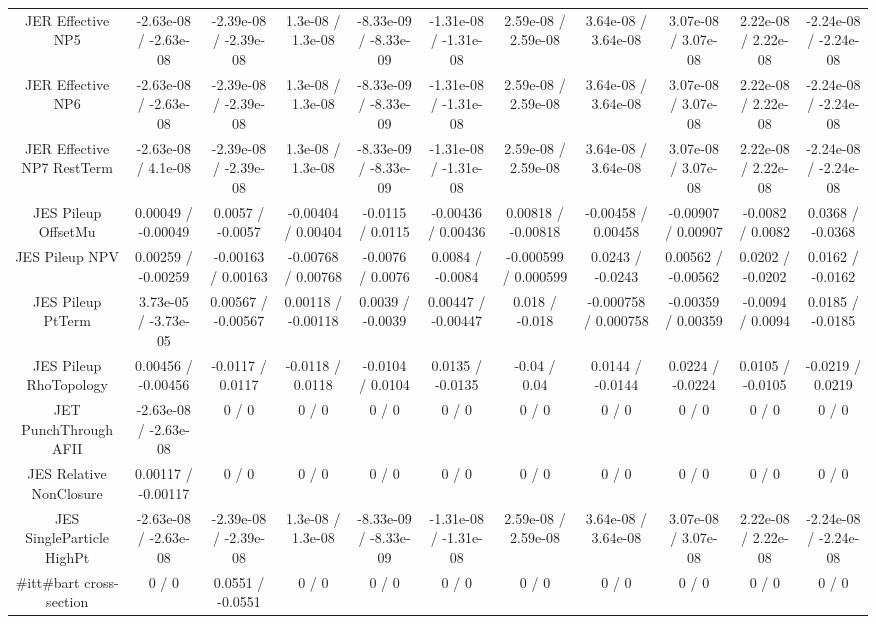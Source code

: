 \begin{table}[htbp]
\begin{center}
\begin{tabular}{|c|c|c|c|c|c|c|c|c|c|c|}
  JER Effective NP5 & -2.63e-08 / -2.63e-08 & -2.39e-08 / -2.39e-08 & 1.3e-08 / 1.3e-08 & -8.33e-09 / -8.33e-09 & -1.31e-08 / -1.31e-08 & 2.59e-08 / 2.59e-08 & 3.64e-08 / 3.64e-08 & 3.07e-08 / 3.07e-08 & 2.22e-08 / 2.22e-08 & -2.24e-08 / -2.24e-08 \\ 
  JER Effective NP6 & -2.63e-08 / -2.63e-08 & -2.39e-08 / -2.39e-08 & 1.3e-08 / 1.3e-08 & -8.33e-09 / -8.33e-09 & -1.31e-08 / -1.31e-08 & 2.59e-08 / 2.59e-08 & 3.64e-08 / 3.64e-08 & 3.07e-08 / 3.07e-08 & 2.22e-08 / 2.22e-08 & -2.24e-08 / -2.24e-08 \\ 
  JER Effective NP7 RestTerm & -2.63e-08 / 4.1e-08 & -2.39e-08 / -2.39e-08 & 1.3e-08 / 1.3e-08 & -8.33e-09 / -8.33e-09 & -1.31e-08 / -1.31e-08 & 2.59e-08 / 2.59e-08 & 3.64e-08 / 3.64e-08 & 3.07e-08 / 3.07e-08 & 2.22e-08 / 2.22e-08 & -2.24e-08 / -2.24e-08 \\ 
  JES Pileup OffsetMu & 0.00049 / -0.00049 & 0.0057 / -0.0057 & -0.00404 / 0.00404 & -0.0115 / 0.0115 & -0.00436 / 0.00436 & 0.00818 / -0.00818 & -0.00458 / 0.00458 & -0.00907 / 0.00907 & -0.0082 / 0.0082 & 0.0368 / -0.0368 \\ 
  JES Pileup NPV & 0.00259 / -0.00259 & -0.00163 / 0.00163 & -0.00768 / 0.00768 & -0.0076 / 0.0076 & 0.0084 / -0.0084 & -0.000599 / 0.000599 & 0.0243 / -0.0243 & 0.00562 / -0.00562 & 0.0202 / -0.0202 & 0.0162 / -0.0162 \\ 
  JES Pileup PtTerm & 3.73e-05 / -3.73e-05 & 0.00567 / -0.00567 & 0.00118 / -0.00118 & 0.0039 / -0.0039 & 0.00447 / -0.00447 & 0.018 / -0.018 & -0.000758 / 0.000758 & -0.00359 / 0.00359 & -0.0094 / 0.0094 & 0.0185 / -0.0185 \\ 
  JES Pileup RhoTopology & 0.00456 / -0.00456 & -0.0117 / 0.0117 & -0.0118 / 0.0118 & -0.0104 / 0.0104 & 0.0135 / -0.0135 & -0.04 / 0.04 & 0.0144 / -0.0144 & 0.0224 / -0.0224 & 0.0105 / -0.0105 & -0.0219 / 0.0219 \\ 
  JET PunchThrough AFII & -2.63e-08 / -2.63e-08 & 0 / 0 & 0 / 0 & 0 / 0 & 0 / 0 & 0 / 0 & 0 / 0 & 0 / 0 & 0 / 0 & 0 / 0 \\ 
  JES Relative NonClosure & 0.00117 / -0.00117 & 0 / 0 & 0 / 0 & 0 / 0 & 0 / 0 & 0 / 0 & 0 / 0 & 0 / 0 & 0 / 0 & 0 / 0 \\ 
  JES SingleParticle HighPt & -2.63e-08 / -2.63e-08 & -2.39e-08 / -2.39e-08 & 1.3e-08 / 1.3e-08 & -8.33e-09 / -8.33e-09 & -1.31e-08 / -1.31e-08 & 2.59e-08 / 2.59e-08 & 3.64e-08 / 3.64e-08 & 3.07e-08 / 3.07e-08 & 2.22e-08 / 2.22e-08 & -2.24e-08 / -2.24e-08 \\ 
  #it{t#bar{t}} cross-section & 0 / 0 & 0.0551 / -0.0551 & 0 / 0 & 0 / 0 & 0 / 0 & 0 / 0 & 0 / 0 & 0 / 0 & 0 / 0 & 0 / 0 \\ 

\end{tabular}
\end{center}
\end{table}
